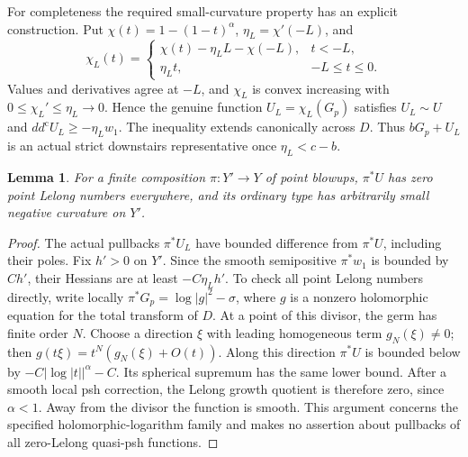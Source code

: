 \documentclass[11pt]{article}
\newtheorem{lemma}[theorem]{Lemma}
\theoremstyle{remark}
\newcommand{\ddc}{dd^{\mathrm c}}
\begin{document}
For completeness the required small-curvature property has an explicit
construction. Put $\chi(t)=1-(1-t)^\alpha$, $\eta_L=\chi'(-L)$, and
\[
 \chi_L(t)=
 \begin{cases}
 \chi(t)-\eta_LL-\chi(-L),&t<-L,\\
 \eta_Lt,&-L\leq t\leq0.
 \end{cases}
\]
Values and derivatives agree at $-L$, and $\chi_L$ is convex increasing
with $0\leq\chi_L'\leq\eta_L\to0$. Hence the genuine function
$U_L=\chi_L(G_p)$ satisfies $U_L\sim U$ and
$\ddc U_L\geq-\eta_Lw_1$. The inequality extends canonically across
$D$. Thus $bG_p+U_L$ is an actual strict downstairs representative once
$\eta_L<c-b$.

\begin{lemma}\label{lem:pullback}
For a finite composition $\pi:Y'\to Y$ of point blowups,
$\pi^*U$ has zero point Lelong numbers everywhere, and its ordinary type
has arbitrarily small negative curvature on $Y'$.
\end{lemma}
\begin{proof}
The actual pullbacks $\pi^*U_L$ have bounded difference from $\pi^*U$,
including their poles. Fix $h'>0$ on $Y'$. Since the smooth semipositive
$\pi^*w_1$ is bounded by $C h'$, their Hessians are at least
$-C\eta_Lh'$.
To check all point Lelong numbers directly, write locally
$\pi^*G_p=\log|g|^2-\sigma$, where $g$ is a nonzero holomorphic
equation for the total transform of $D$. At a point of this divisor,
the germ has finite order $N$. Choose a direction $\xi$ with leading
homogeneous term $g_N(\xi)\ne0$; then
$g(t\xi)=t^N(g_N(\xi)+O(t))$. Along this direction $\pi^*U$ is
bounded below by $-C|\log|t||^\alpha-C$. Its spherical supremum has
the same lower bound. After a smooth local psh correction, the Lelong
growth quotient is therefore zero, since $\alpha<1$. Away from the
divisor the function is smooth. This argument concerns the specified
holomorphic-logarithm family and makes no assertion about pullbacks of
all zero-Lelong quasi-psh functions.
\end{proof}
\end{document}

